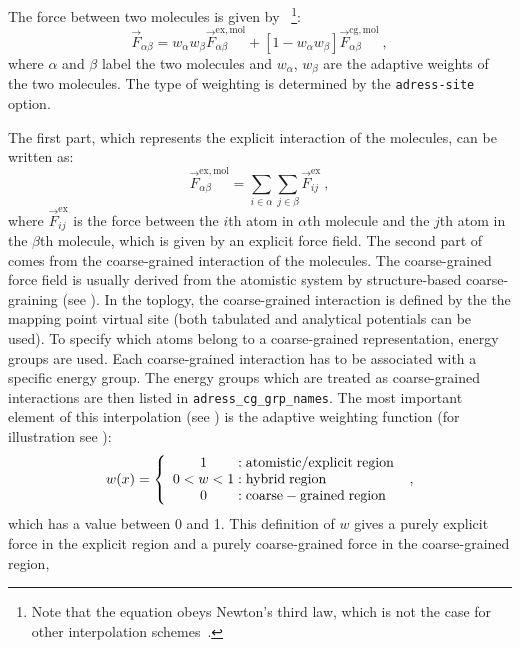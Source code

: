 The force between two molecules is given by~\cite{Praprotnik2005}
\footnote{Note that the equation obeys Newton's third law, which is not the case for other interpolation schemes~\cite{DelleSite2007}.}:
\begin{equation}
\vec{F}_{\alpha\beta}=w_\alpha w_\beta \vec{F}^\mathrm{ex,mol}_{\alpha\beta} + \left[1-w_\alpha w_\beta\right] \vec{F}^\mathrm{cg,mol}_{\alpha\beta}~,
\label{eqn:interpolation}
\end{equation}
where $\alpha$ and $\beta$ label the two molecules and $w_\alpha$, $w_\beta$ are the adaptive weights of the two molecules. The type of weighting is determined by the {\tt adress-site} option.

The first part, which represents the explicit interaction of the molecules, can be written as:
\begin{equation}
\vec{F}^\mathrm{ex,mol}_{\alpha\beta}=\sum_{i\in\alpha}\sum_{j\in\beta} \vec{F}^\mathrm{ex}_{ij}~,
\end{equation}
where $\vec{F}^\mathrm{ex}_{ij}$ is the force between the $i$th atom  in  $\alpha$th molecule and the $j$th atom in the $\beta$th molecule, which is given by an explicit force field.
The second part of  comes from the coarse-grained interaction of the molecules.
The coarse-grained force field is usually derived from the atomistic system by structure-based coarse-graining (see ). In the toplogy, the coarse-grained interaction is defined by the the mapping point virtual site (both tabulated and analytical potentials can be used). To specify which atoms belong to a coarse-grained representation, energy groups are used.
Each coarse-grained interaction has to be associated with a specific energy group. The energy groups which are treated as coarse-grained interactions are then listed in {\tt adress_cg_grp_names}.
The most important element of this interpolation (see ) is the adaptive weighting function (for illustration see ):
\begin{equation}
w(x)=
\left\{\begin{array}{c@{\;:\;}l}
1&\mathrm{atomistic/explicit\;region}\\
0<w<1&\mathrm{hybrid\;region}\\
0&\mathrm{coarse-grained\;region}
\end{array}\right.~,
\label{equ:weighting}
\end{equation}
which has a value between 0 and 1.
This definition of $w$ gives a purely explicit force in the explicit region and a purely coarse-grained force in the coarse-grained region,
